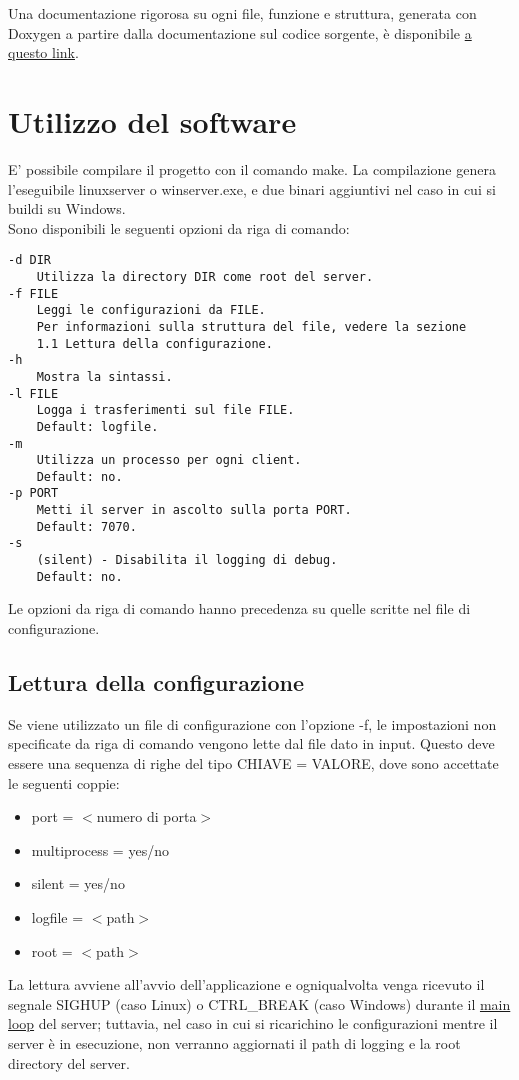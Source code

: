 \documentclass{article}
\begin{document}
\tableofcontents

\vspace{15mm} %
Una documentazione rigorosa su ogni file, funzione e struttura, generata con Doxygen a partire dalla 
documentazione sul codice sorgente, è disponibile \href{html/index.html}{a questo link}. 

\newpage

\section{Utilizzo del software}

E' possibile compilare il progetto con il comando make. La compilazione genera l'eseguibile linuxserver o winserver.exe,
e due binari aggiuntivi nel caso in cui si buildi su Windows.\\
Sono disponibili le seguenti opzioni da riga di comando:\\
\begin{lstlisting}
-d DIR
    Utilizza la directory DIR come root del server.
-f FILE 
    Leggi le configurazioni da FILE. 
    Per informazioni sulla struttura del file, vedere la sezione 
    1.1 Lettura della configurazione.
-h
    Mostra la sintassi.
-l FILE
    Logga i trasferimenti sul file FILE. 
    Default: logfile.
-m 
    Utilizza un processo per ogni client. 
    Default: no.
-p PORT
    Metti il server in ascolto sulla porta PORT. 
    Default: 7070.
-s
    (silent) - Disabilita il logging di debug. 
    Default: no.

\end{lstlisting}
Le opzioni da riga di comando hanno precedenza su quelle scritte nel file di configurazione.

\subsection{Lettura della configurazione}

Se viene utilizzato un file di configurazione con l'opzione -f, le impostazioni non specificate
da riga di comando vengono lette dal file dato in input. Questo deve essere una sequenza di righe del tipo CHIAVE = VALORE, 
dove sono accettate le seguenti coppie:
\begin{itemize}
    \item port = $<$numero di porta$>$
    \item multiprocess = yes/no
    \item silent = yes/no
    \item logfile = $<$path$>$
    \item root = $<$path$>$
\end{itemize}
La lettura avviene all'avvio dell'applicazione e ogniqualvolta venga ricevuto il segnale 
SIGHUP (caso Linux) o CTRL\_BREAK (caso Windows) durante il \href{}
{main loop} del server; tuttavia, nel caso in cui si ricarichino le configurazioni mentre il server è in esecuzione,
non verranno aggiornati il path di logging e la root directory del server.\\
\end{document}

